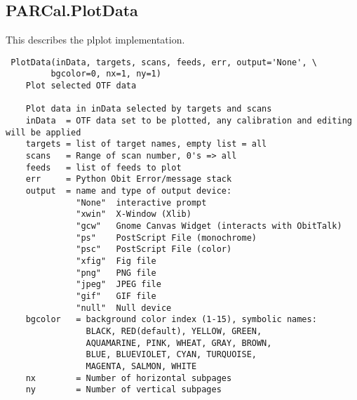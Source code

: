 \documentclass[11pt]{report}
\begin{document}
\subsection{PARCal.PlotData \label{OTFPlots}}
This describes the plplot implementation.
\begin{verbatim}
 PlotData(inData, targets, scans, feeds, err, output='None', \
         bgcolor=0, nx=1, ny=1)
    Plot selected OTF data
    
    Plot data in inData selected by targets and scans
    inData  = OTF data set to be plotted, any calibration and editing will be applied
    targets = list of target names, empty list = all
    scans   = Range of scan number, 0's => all
    feeds   = list of feeds to plot
    err     = Python Obit Error/message stack
    output  = name and type of output device:
              "None"  interactive prompt
              "xwin"  X-Window (Xlib)
              "gcw"   Gnome Canvas Widget (interacts with ObitTalk)
              "ps"    PostScript File (monochrome)
              "psc"   PostScript File (color)
              "xfig"  Fig file
              "png"   PNG file
              "jpeg"  JPEG file
              "gif"   GIF file
              "null"  Null device
    bgcolor   = background color index (1-15), symbolic names:
                BLACK, RED(default), YELLOW, GREEN, 
                AQUAMARINE, PINK, WHEAT, GRAY, BROWN,
                BLUE, BLUEVIOLET, CYAN, TURQUOISE,
                MAGENTA, SALMON, WHITE
    nx        = Number of horizontal subpages
    ny        = Number of vertical subpages
    
\end{verbatim}
\end{document}
